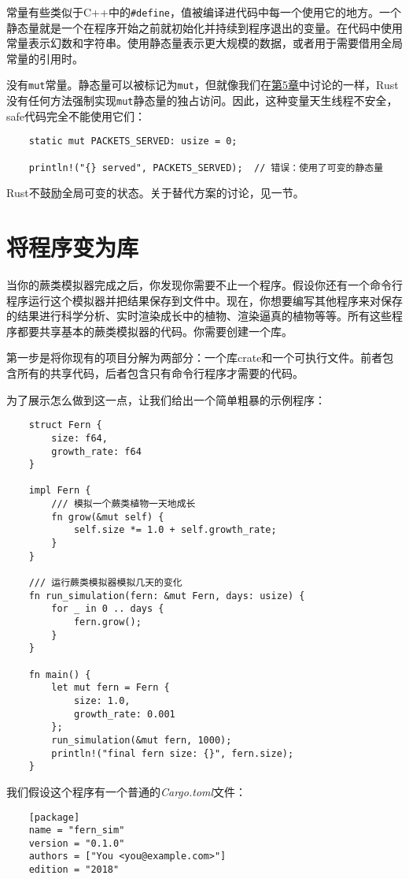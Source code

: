 常量有些类似于C++中的\texttt{\#define}，值被编译进代码中每一个使用它的地方。一个静态量就是一个在程序开始之前就初始化并持续到程序退出的变量。在代码中使用常量表示幻数和字符串。使用静态量表示更大规模的数据，或者用于需要借用全局常量的引用时。

没有\texttt{mut}常量。静态量可以被标记为\texttt{mut}，但就像我们在\hyperref[ch05]{第5章}中讨论的一样，Rust没有任何方法强制实现\texttt{mut}静态量的独占访问。因此，这种变量天生线程不安全，safe代码完全不能使用它们：
\begin{verbatim}
    static mut PACKETS_SERVED: usize = 0;

    println!("{} served", PACKETS_SERVED);  // 错误：使用了可变的静态量
\end{verbatim}

Rust不鼓励全局可变的状态。关于替代方案的讨论，见一节。

\section{将程序变为库}

当你的蕨类模拟器完成之后，你发现你需要不止一个程序。假设你还有一个命令行程序运行这个模拟器并把结果保存到文件中。现在，你想要编写其他程序来对保存的结果进行科学分析、实时渲染成长中的植物、渲染逼真的植物等等。所有这些程序都要共享基本的蕨类模拟器的代码。你需要创建一个库。

第一步是将你现有的项目分解为两部分：一个库crate和一个可执行文件。前者包含所有的共享代码，后者包含只有命令行程序才需要的代码。

为了展示怎么做到这一点，让我们给出一个简单粗暴的示例程序：
\begin{verbatim}
    struct Fern {
        size: f64,
        growth_rate: f64
    }

    impl Fern {
        /// 模拟一个蕨类植物一天地成长
        fn grow(&mut self) {
            self.size *= 1.0 + self.growth_rate;
        }
    }

    /// 运行蕨类模拟器模拟几天的变化
    fn run_simulation(fern: &mut Fern, days: usize) {
        for _ in 0 .. days {
            fern.grow();
        }
    }

    fn main() {
        let mut fern = Fern {
            size: 1.0,
            growth_rate: 0.001
        };
        run_simulation(&mut fern, 1000);
        println!("final fern size: {}", fern.size);
    }
\end{verbatim}

我们假设这个程序有一个普通的\emph{Cargo.toml}文件：
\begin{verbatim}
    [package]
    name = "fern_sim"
    version = "0.1.0"
    authors = ["You <you@example.com>"]
    edition = "2018"
\end{verbatim}

